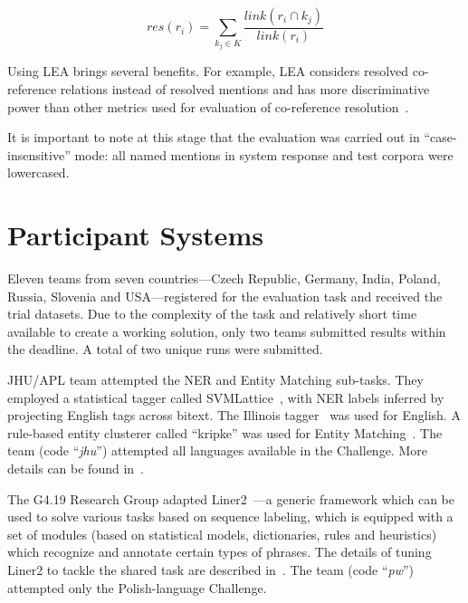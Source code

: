 \documentclass[11pt]{article}
\newcommand{\comment}[1]{}
\begin{document}
\begin{equation*}
	\mathit{res}(r_i) = \sum_{k_{j} \in K} \frac{\mathit{link}(r_{i} \cap k_{j})}{\mathit{link}(r_{i})}
\end{equation*}

Using LEA brings several benefits.  For example, LEA considers resolved
co-reference relations instead of resolved mentions and has more
discriminative power than other metrics used for evaluation of
co-reference resolution~\cite{DBLP:conf-acl-Moosavi016}.

It is important to note at this stage that the evaluation was carried out
in ``case-insensitive'' mode: all named mentions in system response and
test corpora were lowercased.


\section{Participant Systems}
\label{sec:participants}
 
Eleven teams from seven countries---Czech Republic, Germany, India,
Poland, Russia, Slovenia and USA---registered for the evaluation task and
received the trial datasets.  Due to the complexity of the task and
relatively short time available to create a working solution, only two
teams submitted results within the deadline.  A total of two unique runs
were submitted.

JHU/APL team attempted the NER and Entity Matching sub-tasks.  They
employed a statistical tagger called
SVMLattice~\cite{Mayfield:2003:LTU:956863.956921}, with NER labels
inferred by projecting English tags across bitext.  The Illinois
tagger~\cite{Ratinov:2009:DCM:1596374.1596399} was used for English. A
rule-based entity clusterer called ``kripke'' was used for Entity
Matching~\cite{DBLP:conf/tac/McNameeMFL13}.
%
The team (code ``{\em jhu}'') attempted all languages available in the
Challenge. More details can be found in~\cite{mayfield:2017}.

The {G4.19 Research Group} adapted
Liner2~\cite{series/sci/MarcinczukKJ13}---a generic framework which can
be used to solve various tasks based on sequence labeling, which is
equipped with a set of modules (based on statistical models,
dictionaries, rules and heuristics) which recognize and annotate certain
types of phrases.  The details of tuning Liner2 to tackle the shared task
are described in~\cite{marcinczuk:2017}.
%
The team (code ``{\em pw}'') attempted only the Polish-language Challenge.

\comment{
The {\sc DeepNLP} team\footnote{\tt https://github.com/tindzk/bsnlp}
learns entities and their base forms from Wikipedia data
dumps.\footnote{\tt https://dumps.wikimedia.org/} A character-level
recurrent neural network~\cite{DBLP:conf/aaai/KimJSR16} is trained to
predict which characters belong to an entity. A second neural network is
trained on inflected entities and predicts their base forms.
}
\end{document}
